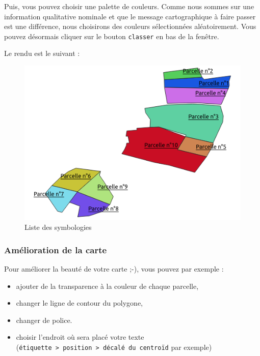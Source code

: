 Puis, vous pouvez choisir une palette de couleurs. Comme nous sommes sur
une information qualitative nominale et que le message cartographique à
faire passer est une différence, nous choisirons des couleurs
sélectionnées aléatoirement. Vous pouvez désormais cliquer sur le bouton
\texttt{classer} en bas de la fenêtre.

Le rendu est le suivant :

\begin{figure}[htbp]
\centering
\includegraphics{figures/parcelles_categorise.png}
\caption{Liste des symbologies}
\end{figure}

\subsubsection{Amélioration de la
carte}\label{amuxe9lioration-de-la-carte}

Pour améliorer la beauté de votre carte ;-), vous pouvez par exemple :

\begin{itemize}
\tightlist
\item
  ajouter de la transparence à la couleur de chaque parcelle,
\item
  changer le ligne de contour du polygone,
\item
  changer de police.
\item
  choisir l'endroit où sera placé votre texte
  (\texttt{étiquette\ \textgreater{}\ position\ \textgreater{}\ décalé\ du\ centroïd}
  par exemple)
\end{itemize}

